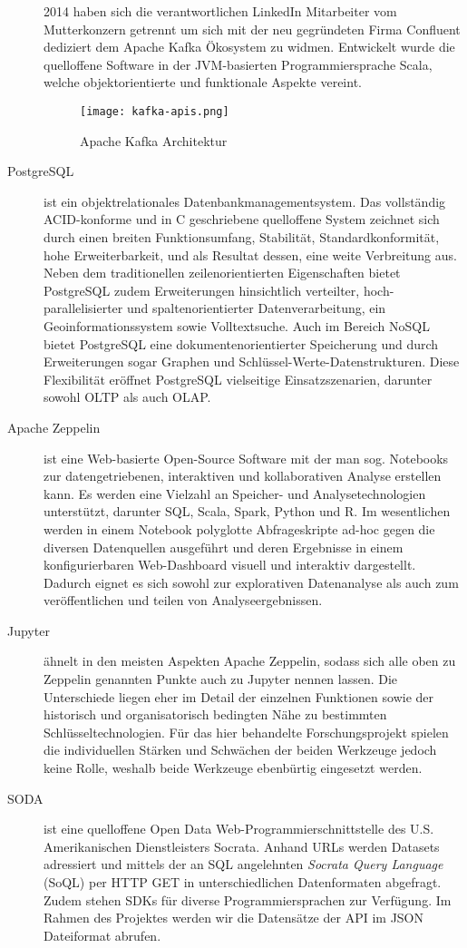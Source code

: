 \begin{description}
	2014 haben sich die verantwortlichen LinkedIn Mitarbeiter vom Mutterkonzern getrennt um sich mit der neu gegründeten Firma Confluent dediziert dem Apache Kafka Ökosystem zu widmen. Entwickelt wurde die quelloffene Software in der JVM-basierten Programmiersprache Scala, welche objektorientierte und funktionale Aspekte vereint.
	\begin{figure}[h]
		\centering
		\texttt{[image: kafka-apis.png]}
		\caption[Apache Kafka Architektur]{Apache Kafka Architektur\autocite{TODO}}
		\label{fig:KafkaArchitecture}
	\end{figure}
	\item [PostgreSQL] ist ein objektrelationales Datenbankmanagementsystem. Das vollständig ACID-konforme und in C geschriebene quelloffene System zeichnet sich durch einen breiten Funktionsumfang, Stabilität, Standardkonformität, hohe Erweiterbarkeit, und als Resultat dessen, eine weite Verbreitung aus. Neben dem traditionellen zeilenorientierten  Eigenschaften bietet PostgreSQL zudem Erweiterungen hinsichtlich verteilter, hoch-parallelisierter und  spaltenorientierter Datenverarbeitung, ein Geoinformationssystem sowie Volltextsuche. Auch im Bereich NoSQL bietet PostgreSQL eine dokumentenorientierter Speicherung und durch Erweiterungen sogar Graphen und Schlüssel-Werte-Datenstrukturen. Diese Flexibilität eröffnet PostgreSQL vielseitige Einsatzszenarien, darunter sowohl OLTP als auch OLAP.
	\item [Apache Zeppelin] ist eine Web-basierte Open-Source Software mit der man sog. Notebooks zur datengetriebenen, interaktiven und kollaborativen Analyse erstellen kann. Es werden eine Vielzahl an Speicher- und Analysetechnologien unterstützt, darunter SQL, Scala, Spark, Python und R. Im wesentlichen werden in einem Notebook polyglotte Abfrageskripte ad-hoc gegen die diversen Datenquellen ausgeführt und deren Ergebnisse in einem konfigurierbaren Web-Dashboard visuell und interaktiv dargestellt. Dadurch eignet es sich sowohl zur explorativen Datenanalyse als auch zum veröffentlichen und teilen von Analyseergebnissen.
	\item [Jupyter] ähnelt in den meisten Aspekten Apache Zeppelin, sodass sich alle oben zu Zeppelin genannten Punkte auch zu Jupyter nennen lassen. Die Unterschiede liegen eher im Detail der einzelnen Funktionen sowie der historisch und organisatorisch bedingten Nähe zu bestimmten Schlüsseltechnologien. Für das hier behandelte Forschungsprojekt spielen die individuellen Stärken und Schwächen der beiden Werkzeuge jedoch keine Rolle, weshalb beide Werkzeuge ebenbürtig eingesetzt werden.
	\item[\ac{SODA}] ist eine quelloffene Open Data Web-Programmierschnittstelle des U.S. Amerikanischen Dienstleisters Socrata. Anhand URLs werden Datasets adressiert und mittels der an SQL angelehnten \textit{Socrata Query Language} (SoQL) per HTTP GET in unterschiedlichen Datenformaten abgefragt. Zudem stehen SDKs für diverse Programmiersprachen zur Verfügung. Im Rahmen des Projektes werden wir die Datensätze der \ac{API} im \ac{JSON} Dateiformat abrufen.
\end{description}
